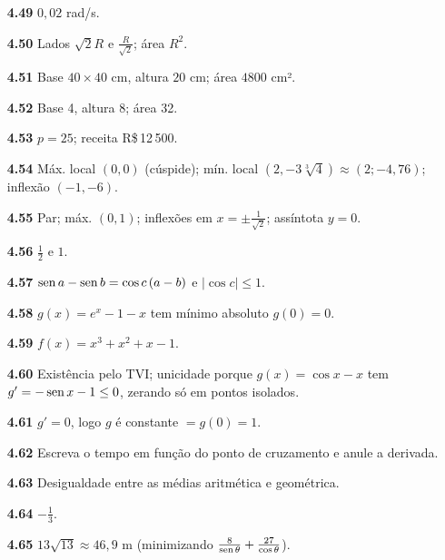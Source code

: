 {\begin{multicols}{2}
\begin{itemize}[leftmargin=2.7em,labelsep=0.5em,itemsep=1pt]
\item[\textbf{4.49}] $0{,}02$ rad/s.
\item[\textbf{4.50}] Lados $\sqrt2R$ e $\tfrac R{\sqrt2}$; área $R^2$.
\item[\textbf{4.51}] Base $40\times40$ cm, altura $20$ cm; área $4800$ cm².
\item[\textbf{4.52}] Base 4, altura 8; área 32.
\item[\textbf{4.53}] $p=25$; receita R\$\,12\,500.
\item[\textbf{4.54}] Máx. local $(0,0)$ (cúspide); mín. local $(2,-3\sqrt[3]4)\approx(2;-4{,}76)$; inflexão $(-1,-6)$.
\item[\textbf{4.55}] Par; máx. $(0,1)$; inflexões em $x=\pm\tfrac1{\sqrt2}$; assíntota $y=0$.
\item[\textbf{4.56}] $\tfrac12$ e $1$.
\item[\textbf{4.57}] $\operatorname{sen} a-\operatorname{sen} b=\cos c\,(a-b)$ e $|\cos c|\le1$.
\item[\textbf{4.58}] $g(x)=e^x-1-x$ tem mínimo absoluto $g(0)=0$.
\item[\textbf{4.59}] $f(x)=x^3+x^2+x-1$.
\item[\textbf{4.60}] Existência pelo TVI; unicidade porque $g(x)=\cos x-x$ tem $g'=-\operatorname{sen} x-1\le0$, zerando só em pontos isolados.
\item[\textbf{4.61}] $g'=0$, logo $g$ é constante $=g(0)=1$.
\item[\textbf{4.62}] Escreva o tempo em função do ponto de cruzamento e anule a derivada.
\item[\textbf{4.63}] Desigualdade entre as médias aritmética e geométrica.
\item[\textbf{4.64}] $-\tfrac13$.
\item[\textbf{4.65}] $13\sqrt{13}\approx46{,}9$ m (minimizando $\tfrac8{\operatorname{sen}\theta}+\tfrac{27}{\cos\theta}$).
\end{itemize}\end{multicols}}
